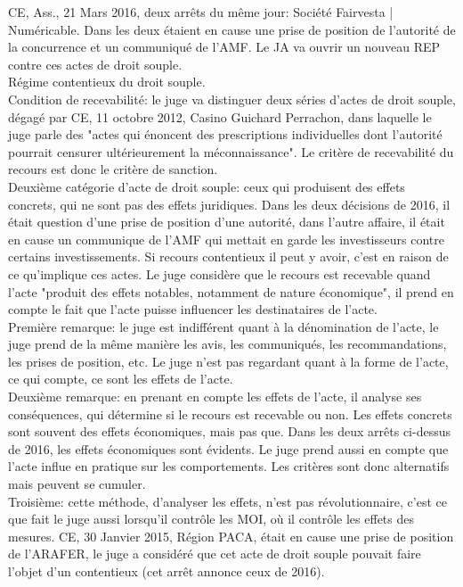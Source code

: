 \documentclass[10pt, a4paper, openany]{book}
\begin{document}
CE, Ass., 21 Mars 2016, deux arrêts du même jour: Société Fairvesta | Numéricable. Dans les deux étaient en cause une prise de position de l'autorité de la concurrence et un communiqué de l'AMF. Le JA va ouvrir un nouveau REP contre ces actes de droit souple. \\


Régime contentieux du droit souple. \\
Condition de recevabilité: le juge va distinguer deux séries d'actes de droit souple, dégagé par CE, 11 octobre 2012, Casino Guichard Perrachon, dans laquelle le juge parle des "actes qui énoncent des prescriptions individuelles dont l'autorité pourrait censurer ultérieurement la méconnaissance". Le critère de recevabilité du recours est donc le critère de sanction. \\
Deuxième catégorie d'acte de droit souple: ceux qui produisent des effets concrets, qui ne sont pas des effets juridiques. Dans les deux décisions de 2016, il était question d'une prise de position d'une autorité, dans l'autre affaire, il était en cause un communique de l'AMF qui mettait en garde les investisseurs contre certains investissements. Si recours contentieux il peut y avoir, c'est en raison de ce qu'implique ces actes. Le juge considère que le recours est recevable quand l'acte "produit des effets notables, notamment de nature économique", il prend en compte le fait que l'acte puisse influencer les destinataires de l'acte. \\
Première remarque: le juge est indifférent quant à la dénomination de l'acte, le juge prend de la même manière les avis, les communiqués, les recommandations, les prises de position, etc. Le juge n'est pas regardant quant à la forme de l'acte, ce qui compte, ce sont les effets de l'acte. \\
Deuxième remarque: en prenant en compte les effets de l'acte, il analyse ses conséquences, qui détermine si le recours est recevable ou non. Les effets concrets sont souvent des effets économiques, mais pas que. Dans les deux arrêts ci-dessus de 2016, les effets économiques sont évidents. Le juge prend aussi en compte que l'acte influe en pratique sur les comportements. Les critères sont donc alternatifs mais peuvent se cumuler. \\
Troisième: cette méthode, d'analyser les effets, n'est pas révolutionnaire, c'est ce que fait le juge aussi lorsqu'il contrôle les MOI, où il contrôle les effets des mesures. CE, 30 Janvier 2015, Région PACA, était en cause une prise de position de l'ARAFER, le juge a considéré que cet acte de droit souple pouvait faire l'objet d'un contentieux (cet arrêt annonce ceux de 2016). \\
\end{document}
